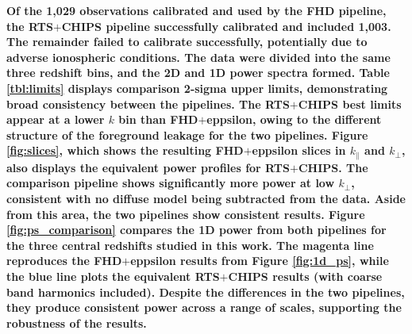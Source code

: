 \documentclass[iop]{emulateapj}
\begin{document}
\textbf{Of the 1,029 observations calibrated and used by the FHD pipeline, the RTS$+$CHIPS pipeline successfully calibrated and included 1,003. The remainder failed to calibrate successfully, potentially due to adverse ionospheric conditions. The data were divided into the same three redshift bins, and the 2D and 1D power spectra formed. Table \ref{tbl:limits} displays comparison 2-sigma upper limits, demonstrating broad consistency between the pipelines. The RTS$+$CHIPS best limits appear at a lower $k$ bin than FHD$+$eppsilon, owing to the different structure of the foreground leakage for the two pipelines. Figure \ref{fig:slices}, which shows the resulting FHD$+$eppsilon slices in $k_\parallel$ and $k_\bot$, also displays the equivalent power profiles for RTS$+$CHIPS. The comparison pipeline shows significantly more power at low $k_\bot$, consistent with no diffuse model being subtracted from the data. Aside from this area, the two pipelines show consistent results. Figure \ref{fig:ps_comparison} compares the 1D power from both pipelines for the three central redshifts studied in this work. The magenta line reproduces the FHD$+$eppsilon results from Figure \ref{fig:1d_ps}, while the blue line plots the equivalent RTS$+$CHIPS results (with coarse band harmonics included). Despite the differences in the two pipelines, they produce consistent power across a range of scales, supporting the robustness of the results.}

\end{document}
